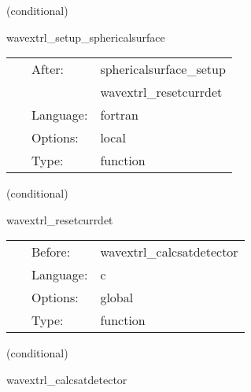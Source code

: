 \vspace{5mm}

   (conditional) 

\hspace{5mm} wavextrl\_setup\_sphericalsurface 

\hspace{5mm}{\it setup detectors from spherical surface } 


\hspace{5mm}

 \begin{tabular*}{160mm}{cll} 
~ & After:  & sphericalsurface\_setup \\ 
~& ~ &wavextrl\_resetcurrdet\\ 
~ & Language:  & fortran \\ 
~ & Options:  & local \\ 
~ & Type:  & function \\ 
\end{tabular*} 


\vspace{5mm}

   (conditional) 

\hspace{5mm} wavextrl\_resetcurrdet 

\hspace{5mm}{\it reset the value of the current\_detector, needed for the while loop next } 


\hspace{5mm}

 \begin{tabular*}{160mm}{cll} 
~ & Before:  & wavextrl\_calcsatdetector \\ 
~ & Language:  & c \\ 
~ & Options:  & global \\ 
~ & Type:  & function \\ 
\end{tabular*} 


\vspace{5mm}

   (conditional) 

\hspace{5mm} wavextrl\_calcsatdetector 

\hspace{5mm}{\it calculations done for each detector, we loop over the detectors } 


\hspace{5mm}

